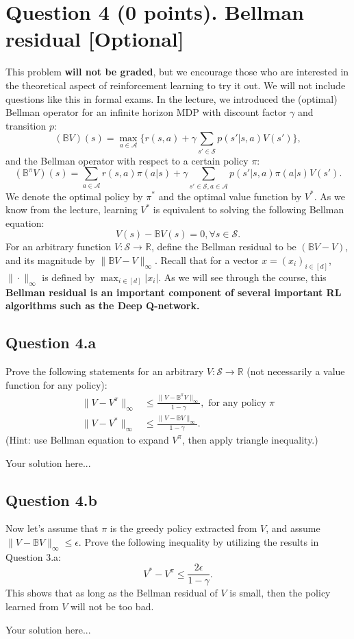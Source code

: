 \documentclass[12pt]{article}
\newcommand*{\bo}{\mathbb{B}}
\begin{document}
\section*{Question 4 (0 points). Bellman residual [Optional]}
This problem \textbf{will not be graded}, but we encourage those who are interested in the theoretical aspect of reinforcement learning to try it out. We will not include questions like this in formal exams. In the lecture, we introduced the (optimal) Bellman operator for an infinite horizon MDP with discount factor $\gamma$ and transition $p$:
$$(\bo V)(s) = \max_{a\in\mathcal{A}} \bigg\{r(s,a) + \gamma \sum_{s'\in\mathcal{S}} p(s'|s,a) V(s')\bigg\},$$
and the Bellman operator with respect to a certain policy $\pi$:
$$(\bo^\pi V)(s) = \sum_{a\in\mathcal{A}} r(s,a)\pi(a|s)+ \gamma \sum_{s'\in\mathcal{S},a\in \mathcal{A}} p(s'|s,a)\pi(a|s) V(s').$$
We denote the optimal policy by $\pi^*$ and the optimal value function by $V^*$. As we know from the lecture, learning $V^*$ is equivalent to solving the following Bellman equation:
$$V(s) -\bo V(s) = 0, \forall s \in \mathcal{S}.$$
For an arbitrary function $V: \mathcal{S} \rightarrow \mathbb{R}$, define the Bellman residual to be $(\bo V - V ) $, and its magnitude by $\|\bo V - V \|_\infty$. Recall that for a vector $x = (x_i)_{i\in[d]}$, $\|\cdot\|_\infty$ is defined by $\max_{i\in[d]} |x_i|$. As we will see through the course, this \textbf{Bellman residual is an important component of several important RL algorithms such as the Deep Q-network. }
%
%
\subsection*{Question 4.a}Prove the following statements for an arbitrary $V: \mathcal{S} \rightarrow \mathbb{R}$ (not necessarily a value function for any policy):
\begin{align*}
    \|V - V^\pi \|_\infty &\leq \frac{\|V - \bo^\pi V\|_\infty}{1-\gamma}, \text{ for any policy } \pi\\
    \|V - V^* \|_\infty &\leq \frac{\|V - \bo V\|_\infty}{1-\gamma}.
\end{align*}
(Hint: use Bellman equation to expand $V^\pi$, then apply triangle inequality.)
\begin{solution}
    Your solution here...
\end{solution}
%
%
\subsection*{Question 4.b} Now let's assume that $\pi$ is the greedy policy extracted from $V$, and assume $\|V - \bo V\|_\infty \leq \epsilon$. Prove the following inequality by utilizing the results in Question 3.a: 
$$V^* - V^{\pi} \leq  \frac{2\epsilon}{1-\gamma}.$$
This shows that as long as the Bellman residual of $V$ is small, then the policy learned from $V$ will not be too bad. 
\begin{solution}
Your solution here...
\end{solution}
\end{document}
